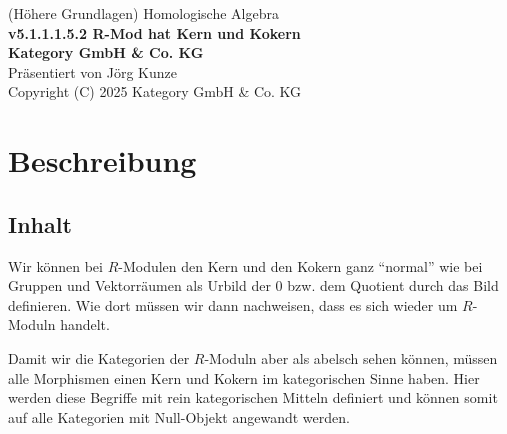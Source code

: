\documentclass[a4paper]{amsart}
\theoremstyle{definition}
\begin{document}
\begin{titlepage}
\centering
{\huge
(Höhere Grundlagen) Homologische Algebra\\[1cm]
\textbf{v5.1.1.1.5.2 R-Mod hat Kern und Kokern}
}\\[1cm]

\textbf{Kategory GmbH \& Co. KG}\\
Präsentiert von Jörg Kunze\\
Copyright (C) 2025 Kategory GmbH \& Co. KG

\end{titlepage}

%

\newpage

\section*{Beschreibung}

\subsection*{Inhalt}
Wir können bei $R$-Modulen den Kern und den Kokern ganz "`normal"' wie bei Gruppen und Vektorräumen als Urbild der $0$ bzw. dem Quotient durch das Bild definieren. Wie dort müssen wir dann nachweisen, dass es sich wieder um $R$-Moduln handelt.

Damit wir die Kategorien der $R$-Moduln aber als abelsch sehen können, müssen alle Morphismen einen Kern und Kokern im kategorischen Sinne haben. Hier werden diese Begriffe mit rein kategorischen Mitteln definiert und können somit auf alle Kategorien mit Null-Objekt angewandt werden.
\end{document}
